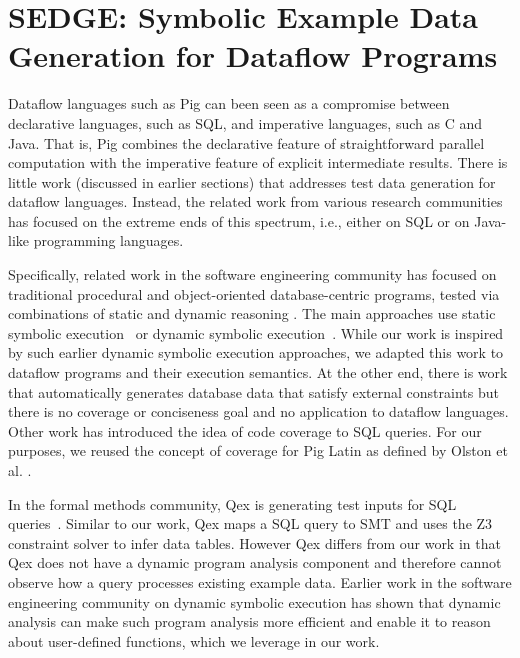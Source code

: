 \section{SEDGE: Symbolic Example Data Generation for Dataflow Programs}

Dataflow languages such as Pig can been seen as a compromise between
declarative languages, such as SQL, and imperative languages, such as C
and Java. That is, Pig combines the declarative feature of
straightforward parallel computation with the imperative feature of
explicit intermediate results. 
There is little work (discussed in earlier sections) that addresses
test data generation for dataflow languages. Instead, the
related work from various research communities has focused on the
extreme ends of this spectrum, i.e., either on SQL or on Java-like
programming languages.

Specifically, related work in the software engineering community has
focused on traditional procedural and object-oriented database-centric
programs, tested via combinations of static and dynamic reasoning
\cite{DBLP:conf/tap/SmaragdakisC07}. The main approaches use static
symbolic execution~\cite{marcozzi12test} or dynamic symbolic
execution~\cite{emmi07dynamic,li10dynamic,pan11generating}.  While our
work is inspired by such earlier dynamic symbolic execution
approaches, we adapted this work to dataflow programs and their
execution semantics. At the other end, there is work that
automatically generates database data that satisfy external
constraints \cite{orm-ase07} but there is no coverage or conciseness
goal and no application to dataflow languages. Other work
\cite{tuya10full} has introduced the idea of code coverage to SQL
queries. For our purposes, we reused the concept of coverage for Pig
Latin as defined by Olston et al.
\cite{Olston:2009:GED:1559845.1559873}.


In the formal methods community, Qex is generating test inputs for SQL 
queries~\cite{veanes10qex}. Similar to our work, Qex maps a SQL
query to SMT and uses the Z3 constraint solver to infer data tables.
However Qex differs from our work in that Qex does not have a dynamic 
program analysis component and therefore cannot observe how a query
processes existing example data. Earlier work in the software engineering
community on dynamic symbolic execution has shown that dynamic analysis
can make such program analysis more efficient and enable it to reason
about user-defined functions, which we leverage in our work.

